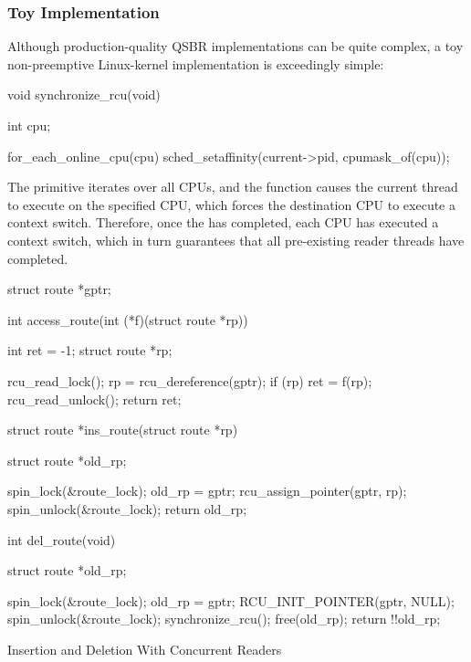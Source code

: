 \QuickQuizEnd

\subsubsection{Toy Implementation}
\label{sec:defer:Toy Implementation}

Although production-quality QSBR implementations can be quite complex,
a toy non-preemptive Linux-kernel implementation is exceedingly simple:

\begin{VerbatimN}[samepage=true]
void synchronize_rcu(void)
{
	int cpu;

	for_each_online_cpu(cpu)
		sched_setaffinity(current->pid, cpumask_of(cpu));
}
\end{VerbatimN}

The  primitive iterates over all CPUs, and
the  function causes the current thread to
execute on the specified CPU, which forces the destination CPU to execute
a context switch.
Therefore, once the  has completed, each CPU
has executed a context switch, which in turn guarantees that
all pre-existing reader threads have completed.

\begin{listing}[tbp]
\begin{fcvlabel}
\begin{VerbatimL}[commandchars=\\\[\]]
struct route *gptr;

int access_route(int (*f)(struct route *rp))
{
	int ret = -1;
	struct route *rp;

	rcu_read_lock();
	rp = rcu_dereference(gptr);
	if (rp)
		ret = f(rp);		\lnlbl[access_rp]
	rcu_read_unlock();
	return ret;
}

struct route *ins_route(struct route *rp)
{
	struct route *old_rp;

	spin_lock(&route_lock);
	old_rp = gptr;
	rcu_assign_pointer(gptr, rp);
	spin_unlock(&route_lock);
	return old_rp;
}

int del_route(void)
{
	struct route *old_rp;

	spin_lock(&route_lock);
	old_rp = gptr;
	RCU_INIT_POINTER(gptr, NULL);
	spin_unlock(&route_lock);
	synchronize_rcu();
	free(old_rp);
	return !!old_rp;
}
\end{VerbatimL}
\end{fcvlabel}
\caption{Insertion and Deletion With Concurrent Readers}
\label{lst:defer:Insertion and Deletion With Concurrent Readers}
\end{listing}

